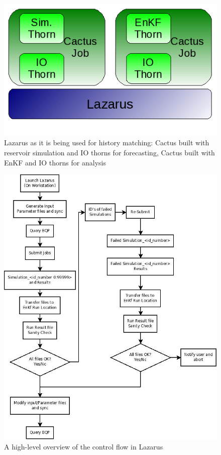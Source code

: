 \documentclass[conference,final]{IEEEtran}
\begin{document}
\begin{figure}
\begin{center}
\includegraphics[scale=0.5]{./figures/Simulations.png}
\caption{Lazarus as it is being used for history matching: Cactus
built with reservoir  simulation and IO thorns for forecasting, Cactus
built with EnKF and IO thorns for analysis
}
\end{center}

\label{fig:application_usage}
\end{figure}


\begin{figure}
\begin{center}
\includegraphics[scale=0.35]{./figures/Diagram1.jpeg}
\end{center}
\caption{A high-level
  overview of the control flow in Lazarus}
\label{fig:controlflow}
\end{figure}
\end{document}
